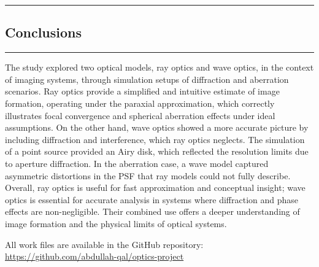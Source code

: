 {\color{gray}\hrule}
\begin{center}
\section{Conclusions}
\bigskip
\end{center}
{\color{gray}\hrule}
\begin{multicols}{2}
The study explored two optical models, ray optics and wave optics, in the context of imaging systems, through simulation setups
of diffraction and aberration scenarios. Ray optics provide a simplified and intuitive estimate of image formation, operating
under the paraxial approximation, which correctly illustrates focal convergence and spherical aberration effects under ideal
assumptions. On the other hand, wave optics showed a more accurate picture by including diffraction and interference, which ray
optics neglects. The simulation of a point source provided an Airy disk, which reflected the resolution limits due to aperture
diffraction. In the aberration case, a wave model captured asymmetric distortions in the PSF that ray models could not fully
describe. Overall, ray optics is useful for fast approximation and conceptual insight; wave optics is essential for accurate
analysis in systems where diffraction and phase effects are non-negligible. Their combined use offers a deeper understanding of
image formation and the physical limits of optical systems.

\end{multicols}

All work files are available in the GitHub repository: \url{https://github.com/abdullah-qal/optics-project}